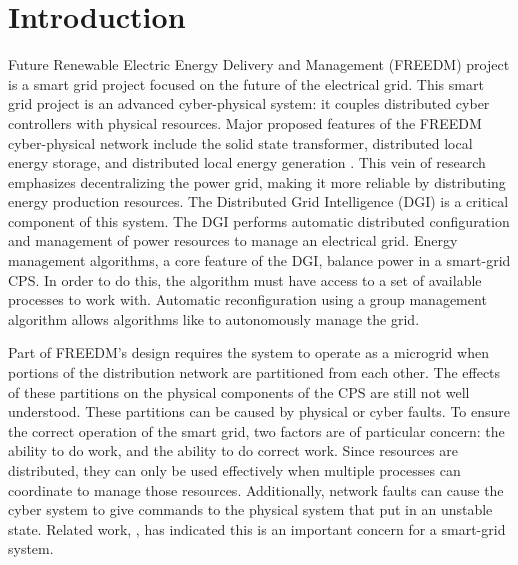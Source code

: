 
\section{Introduction}

 Future Renewable Electric Energy Delivery and Management (FREEDM) project is a smart grid project focused on the future of the electrical grid.
This smart grid project is an advanced cyber-physical system: it couples distributed cyber controllers with physical resources.
Major proposed features of the FREEDM cyber-physical network include the solid state transformer, distributed local energy storage, and distributed local energy generation \cite{FREEDMMIGRATION}.
This vein of research emphasizes decentralizing the power grid, making it more reliable by distributing energy production resources.
The Distributed Grid Intelligence (DGI) is a critical component of this system.
The DGI performs automatic distributed configuration and management of power resources to manage an electrical grid.
Energy management algorithms, a core feature of the DGI\cite{LOADBALANCING}, balance power in a smart-grid CPS.
In order to do this, the algorithm must have access to a set of available processes to work with.
Automatic reconfiguration using a group management algorithm allows algorithms like \cite{LOADBALANCING} to autonomously manage the grid.

Part of FREEDM's design requires the system to operate as a microgrid when portions of the distribution network are partitioned from each other.
The effects of these partitions on the physical components of the CPS are still not well understood.
These partitions can be caused by physical or cyber faults.
To ensure the correct operation of the smart grid, two factors are of particular concern: the ability to do work, and the ability to do correct work.
Since resources are distributed, they can only be used effectively when multiple processes can coordinate to manage those resources.
Additionally, network faults can cause the cyber system to give commands to the physical system that put in an unstable state.
Related work, \cite{HARINI}\cite{TSG}, has indicated this is an important concern for a smart-grid system.

